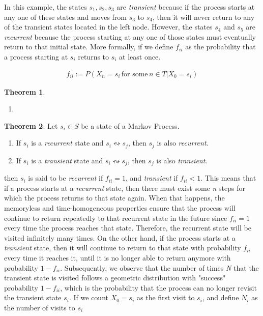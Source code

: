 \documentclass[a4paper,12pt]{article}
\theoremstyle{definition}
\newtheorem{theorem}{Theorem}
\begin{document}
	In this example, the states $s_1, s_2, s_3$ are \emph{transient} because if the process starts at any one of these states 
	and moves from $s_3$ to $s_4$, then it will never return to any of the transient states located in the left node. 
	However, the states $s_4$ and $s_5$ are \emph{recurrent} because the process starting at any one of those states must 
	eventually return to that initial state. More formally, if we define $f_{ii}$ as the probability that a process starting 
	at $s_i$ returns to $s_i$ at least once.
	

	\begin{equation*}
		\begin{aligned}
			f_{ii} := P(X_n = s_i \, \text{for some} \, n \in T | X_0 = s_i)
		\end{aligned}
	\end{equation*}

	\begin{theorem}
		\begin{enumerate}
			\item 
		\end{enumerate}
	\end{theorem}

	\begin{theorem}
		Let $s_i \in S$ be a state of a Markov Process.
		\begin{enumerate}
			\item If $s_i$ is a \emph{recurrent} state and $s_i \leftrightsquigarrow s_j$, then $s_j$ is also \emph{recurrent}.
			\item If $s_i$ is a \emph{transient} state and $s_i \leftrightsquigarrow s_j$, then $s_j$ is also \emph{transient}.
		\end{enumerate}
	\end{theorem}
	 
	then $s_i$ is said to be \emph{recurrent} if $f_{ii} = 1$, and \emph{transient} if $f_{ii} < 1$. This means that if a process starts at a \emph{recurrent} state, then there must exist some \emph{n} steps for which the process returns to that state again. When that happens, the memoryless and time-homogeneous properties ensure that the process will continue to return repeatedly to that recurrent state in the future since $f_{ii} = 1$ every time the process reaches that state.  Therefore, the recurrent state will be visited infinitely many times. On the other hand, if the process starts at a \emph{transient} state, then it will continue to return to that state with probability $f_{ii}$ every time it reaches it, until it is no longer able to return anymore with probability $1 - f_{ii}$. Subsequently, we observe that the number of times \emph{N} that the transient state is visited follows a geometric distribution with "success" probability $1 - f_{ii}$, which is the probability that the process can no longer revisit the transient state $s_i$. If we  count $X_0 = s_i$ as the first visit to $s_i$, and define $N_i$ as the number of visits to $s_i$
	
\end{document}
